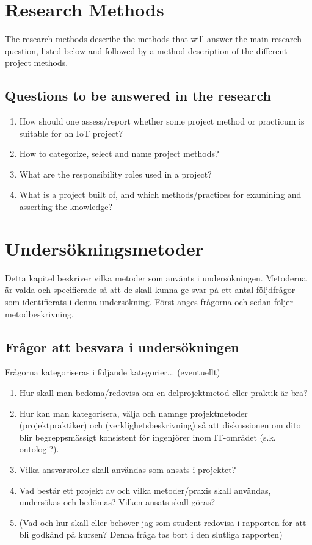 \section{Research Methods}

The research methods describe the methods that will answer the main research question, listed below and followed by a method description of the different project methods.


\subsection{Questions to be answered in the research}

\begin{enumerate}
    \item{How should one assess/report whether some project method or practicum is suitable for an IoT project?}
    \item{How to categorize, select and name project methods?}
    \item{What are the responsibility roles used in a project?}
    \item{What is a project built of, and which methods/practices for examining and asserting the knowledge?}
\end{enumerate}








\section{Undersökningsmetoder}
Detta kapitel beskriver vilka metoder som använts i undersökningen. Metoderna är
valda och specifierade så att de skall kunna ge svar på ett antal följdfrågor som
identifierats i denna undersökning. Först anges frågorna och sedan följer
metodbeskrivning.

\subsection{Frågor att besvara i undersökningen}
Frågorna kategoriseras i följande kategorier... (eventuellt)
\begin{enumerate}
    \item Hur skall man bedöma/redovisa om en delprojektmetod eller praktik är bra?
    \item Hur kan man kategorisera, välja och namnge projektmetoder (projektpraktiker)
    och (verklighetsbeskrivning) så att diskussionen om dito blir begreppsmässigt
    konsistent för ingenjörer inom IT-området (s.k. ontologi?).
    \item Vilka ansvarsroller skall användas som ansats i projektet?
    \item Vad består ett projekt av och vilka metoder/praxis skall användas, undersökas
    och bedömas? Vilken ansats skall göras?
    \item (Vad och hur skall eller behöver jag som student redovisa i rapporten för att
    bli godkänd på kursen? Denna fråga tas bort i den slutliga rapporten)
\end{enumerate}

